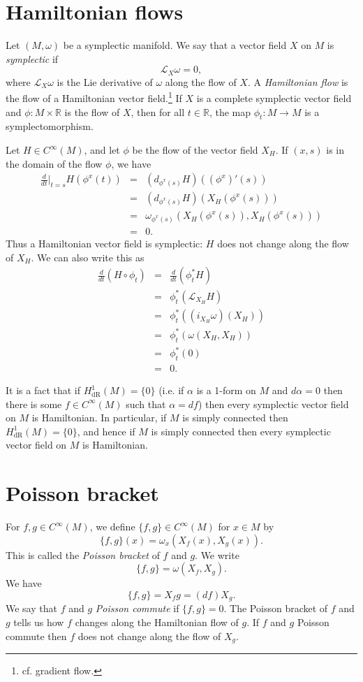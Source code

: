 \documentclass{article}
\begin{document}
\section{Hamiltonian flows}
Let $(M,\omega)$ be a symplectic manifold.
We say that a vector field $X$ on $M$ is {\em symplectic} if
\[
\mathcal{L}_X \omega=0,
\]
where $\mathcal{L}_X \omega$ is the Lie derivative of $\omega$ along the flow of $X$. A {\em Hamiltonian flow} is the flow
of a Hamiltonian vector field.\footnote{cf. gradient flow.}
If $X$ is a complete symplectic vector field and $\phi:M \times \mathbb{R}$ is the flow of $X$, then for all $t \in \mathbb{R}$,
the map $\phi_t:M \to M$ is a symplectomorphism.

Let $H \in C^\infty(M)$, and let $\phi$ be the flow of the vector field $X_H$. If $(x,s)$ is in the domain of the flow
$\phi$, we have
\begin{eqnarray*}
\frac{d}{dt}\Big|_{t=s} H(\phi^x(t)) &=&(d_{\phi^x(s)}H)((\phi^x)'(s))\\
&=&(d_{\phi^x(s)}H)(X_H(\phi^x(s)))\\
&=&\omega_{\phi^x(s)}(X_H(\phi^x(s)),X_H(\phi^x(s)))\\
&=&0.
\end{eqnarray*}
Thus a Hamiltonian vector field is symplectic: $H$ does not change along the flow of $X_H$. We can also write this as
\begin{eqnarray*}
\frac{d}{dt} (H \circ \phi_t) &=&\frac{d}{dt}(\phi_t^* H)\\
&=&\phi_t^* (\mathcal{L}_{X_H} H)\\
&=&\phi_t^*((i_{X_H} \omega)(X_H))\\
&=&\phi_t^*(\omega(X_H,X_H))\\
&=&\phi_t^*(0)\\
&=&0.
\end{eqnarray*}

It is a fact that if $H_{\textrm{dR}}^1(M)=\{0\}$ (i.e. if $\alpha$ is a 1-form on $M$ and $d\alpha=0$ then
there is some $f \in C^\infty(M)$ such that $\alpha=df$) then every symplectic vector field on $M$ is Hamiltonian. In particular,
if $M$ is simply connected then $H_{\textrm{dR}}^1(M)=\{0\}$, and hence if $M$ is simply connected then every
symplectic vector field on $M$ is Hamiltonian.

\section{Poisson bracket}
For $f,g \in C^\infty(M)$, we define $\{f,g\} \in C^\infty(M)$ for $x \in M$ by
\[
\{f,g\}(x)=\omega_x(X_f(x),X_g(x)).
\]
This is called the {\em Poisson bracket} of $f$ and $g$.
We write
\[
\{f,g\}=\omega(X_f,X_g).
\]
We have
\[
\{f,g\}=X_f g=(df)X_g.
\]
We say that $f$ and $g$ {\em Poisson commute} if $\{f,g\}=0$. The 
Poisson bracket of $f$ and $g$ tells us how $f$ changes along the Hamiltonian flow of $g$. If $f$ and $g$ Poisson commute
then $f$ does not change along the flow of $X_g$.
\end{document}
